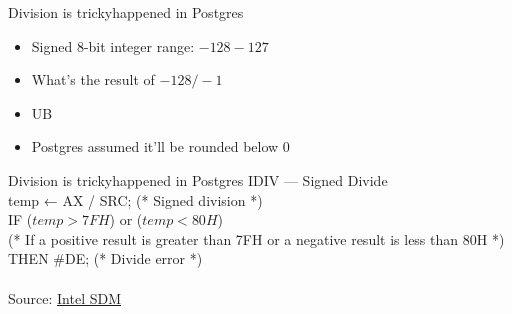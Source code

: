 \documentclass{beamer}
\begin{document}
\begin{frame}{Division is tricky}{happened in Postgres}
  \begin{itemize}
    \item Signed 8-bit integer range: $-128-127$
    \item What's the result of $-128/-1$
    \item UB
    \item Postgres assumed it'll be rounded below 0
  \end{itemize}
\end{frame}


\begin{frame}{Division is tricky}{happened in Postgres}
  IDIV — Signed Divide\\
temp ← AX / SRC; (* Signed division *) \\
  IF ($temp > 7FH$) or ($temp < 80H$) \\
  (* If a positive result is greater than 7FH or a negative result is less than 80H *) \\
    THEN \#DE; (* Divide error *)\\\\

  Source: \href{https://www.felixcloutier.com/x86/idiv}{Intel SDM}
\end{frame}
\end{document}
